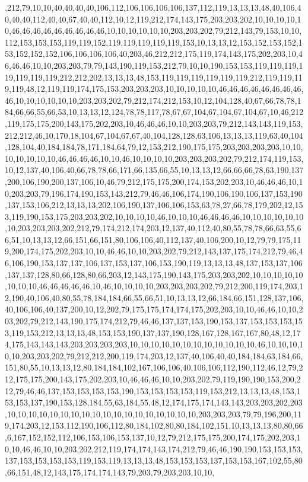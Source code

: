 ,212,79,10,10,40,40,40,40,106,112,106,106,106,106,137,112,119,13,13,13,48,40,106,40,40,40,112,40,40,67,40,40,112,10,12,119,212,174,143,175,203,203,202,10,10,10,10,10,46,46,46,46,46,46,46,46,46,10,10,10,10,10,10,203,203,202,79,212,143,79,153,10,10,112,153,153,153,119,119,152,119,119,119,119,119,153,10,13,13,12,153,152,153,152,153,152,152,152,106,106,106,106,40,203,46,212,212,175,119,174,143,175,202,203,10,46,46,46,10,10,203,203,79,79,143,190,119,153,212,79,10,10,190,153,153,119,119,119,119,119,119,119,212,212,202,13,13,13,48,153,119,119,119,119,119,119,212,119,119,119,119,48,12,119,119,174,175,153,203,203,203,10,10,10,10,10,46,46,46,46,46,46,46,46,46,10,10,10,10,10,10,203,203,202,79,212,174,212,153,10,12,104,128,40,67,66,78,78,184,66,66,55,66,53,10,13,13,12,124,78,78,117,78,67,67,104,67,104,67,104,67,10,46,212,119,175,175,200,143,175,202,203,10,46,46,46,10,10,203,203,79,212,143,143,119,153,212,212,46,10,170,18,104,67,104,67,67,40,104,128,128,63,106,13,13,13,119,63,40,104,128,104,40,184,184,78,171,184,64,79,12,153,212,190,175,175,203,203,203,203,10,10,10,10,10,10,10,46,46,46,46,10,10,46,10,10,10,10,203,203,203,202,79,212,174,119,153,10,12,137,40,106,40,66,78,78,66,171,66,135,66,55,10,13,13,12,66,66,66,78,63,190,137,200,106,190,200,137,106,10,46,79,212,175,175,200,174,153,202,203,10,46,46,46,10,10,203,203,79,196,174,190,153,143,212,79,46,46,106,174,190,106,190,106,137,153,190,137,153,106,212,13,13,13,202,106,190,137,106,106,153,63,78,27,66,78,179,202,12,153,119,190,153,175,203,203,202,10,10,10,10,46,10,10,10,46,46,46,46,10,10,10,10,10,10,10,203,203,203,202,212,79,174,212,174,203,12,137,40,112,40,80,55,78,78,66,63,55,66,51,10,13,13,12,66,151,66,151,80,106,106,40,112,137,40,106,200,10,12,79,79,175,119,200,174,175,202,203,10,10,46,46,10,10,203,202,79,212,143,137,175,174,212,79,46,46,106,190,153,137,137,106,137,153,137,106,153,190,119,13,13,13,48,137,153,137,106,137,137,128,80,66,128,80,66,203,12,143,175,190,143,175,203,203,202,10,10,10,10,10,10,10,10,46,46,46,46,46,10,46,10,10,10,10,203,203,203,202,79,212,200,119,174,203,12,190,40,106,40,80,55,78,184,184,66,55,66,51,10,13,13,12,66,184,66,151,128,137,106,40,106,106,40,137,200,10,12,202,79,175,175,174,174,175,202,203,10,10,46,46,10,10,203,202,79,212,143,190,175,174,212,79,46,46,137,137,153,190,153,137,153,153,153,153,119,153,212,13,13,13,48,153,153,190,137,137,190,128,167,128,167,167,80,48,12,174,175,143,143,143,203,203,203,203,10,10,10,10,10,10,10,10,10,10,10,10,46,10,10,10,10,10,203,203,202,79,212,212,200,119,174,203,12,137,40,106,40,40,184,184,63,184,66,151,80,55,10,13,13,12,80,184,184,102,167,106,106,40,106,106,112,190,112,46,12,79,212,175,175,200,143,175,202,203,10,46,46,46,10,10,203,202,79,119,190,190,153,200,212,79,46,46,137,153,153,153,153,190,153,153,153,153,119,153,212,13,13,13,48,153,153,153,137,190,153,128,184,55,63,184,55,48,12,174,175,174,143,143,203,203,202,203,10,10,10,10,10,10,10,10,10,10,10,10,10,10,10,10,10,10,203,203,203,79,79,196,200,119,174,203,12,153,112,190,106,112,80,184,102,80,80,184,102,151,10,13,13,13,80,80,66,6,167,152,152,112,106,153,106,153,137,10,12,79,212,175,175,200,174,175,202,203,10,10,46,46,10,10,203,202,212,119,174,174,143,174,212,79,46,46,190,190,153,153,153,137,153,153,153,153,119,153,119,13,13,13,48,153,153,153,137,153,153,167,102,55,80,66,151,48,12,143,175,174,174,143,79,203,79,203,203,10,10,